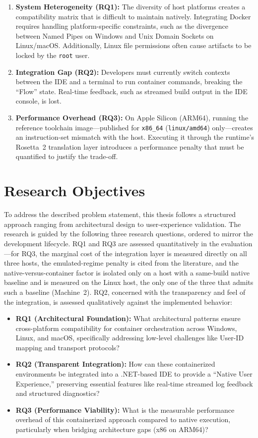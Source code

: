 \begin{enumerate}
    \item \textbf{System Heterogeneity (RQ1):} The diversity of host platforms creates a compatibility matrix that is difficult to maintain natively. Integrating Docker requires handling platform-specific constraints, such as the divergence between Named Pipes on Windows and Unix Domain Sockets on Linux/macOS. Additionally, Linux file permissions often cause artifacts to be locked by the \texttt{root} user.
    \item \textbf{Integration Gap (RQ2):} Developers must currently switch contexts between the IDE and a terminal to run container commands, breaking the ``Flow'' state. Real-time feedback, such as streamed build output in the IDE console, is lost.
    \item \textbf{Performance Overhead (RQ3):} On Apple Silicon (ARM64), running the reference toolchain image---published for \texttt{x86\_64} (\texttt{linux/amd64}) only---creates an instruction-set mismatch with the host. Executing it through the runtime's Rosetta~2 translation layer introduces a performance penalty that must be quantified to justify the trade-off.
\end{enumerate}

\section{Research Objectives}
To address the described problem statement, this thesis follows a structured approach ranging from architectural design to user-experience validation. The research is guided by the following three research questions, ordered to mirror the development lifecycle. RQ1 and RQ3 are assessed quantitatively in the evaluation---for RQ3, the marginal cost of the integration layer is measured directly on all three hosts, the emulated-regime penalty is cited from the literature, and the native-versus-container factor is isolated only on a host with a same-build native baseline and is measured on the Linux host, the only one of the three that admits such a baseline (Machine~2). RQ2, concerned with the transparency and feel of the integration, is assessed qualitatively against the implemented behavior:

\begin{itemize}
    \item \textbf{RQ1 (Architectural Foundation):} What architectural patterns ensure cross-platform compatibility for container orchestration across Windows, Linux, and macOS, specifically addressing low-level challenges like User-ID mapping and transport protocols?
    \item \textbf{RQ2 (Transparent Integration):} How can these containerized environments be integrated into a .NET-based IDE to provide a ``Native User Experience,'' preserving essential features like real-time streamed log feedback and structured diagnostics?
    \item \textbf{RQ3 (Performance Viability):} What is the measurable performance overhead of this containerized approach compared to native execution, particularly when bridging architecture gaps (x86 on ARM64)?
\end{itemize}


